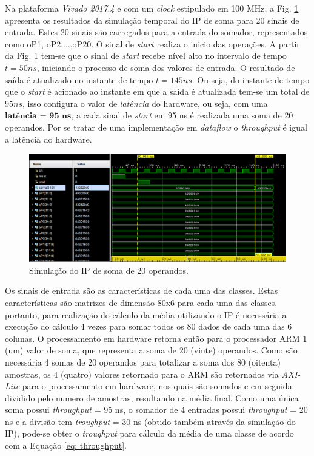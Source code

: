 Na plataforma \textit{Vivado 2017.4} e com um \textit{clock} estipulado em 100 MHz, a Fig. \ref{simulacao_sum} apresenta os resultados da simulação temporal do IP de soma para 20 sinais de entrada. Estes 20 sinais são carregados para a entrada do somador, representados como oP1, oP2,...,oP20. O sinal de \textit{start} realiza o inicio das operações. A partir da Fig. \ref{simulacao_sum} tem-se que o sinal de \textit{start} recebe nível alto no intervalo de tempo $t = 50 ns$, iniciando o processo de soma dos valores de entrada. O resultado de saída é atualizado no instante de tempo $t = 145 ns$. Ou seja, do instante de tempo que o \textit{start} é acionado ao instante em que a saída é atualizada tem-se um total de $95 ns$, isso configura o valor de \textit{latência} do hardware, ou seja, com uma $\textbf{latência = 95 ns}$, a cada sinal de \textit{start} em 95 ns é realizada uma soma de 20 operandos. Por se tratar de uma implementação em \textit{dataflow} o \textit{throughput} é igual a latência do hardware.

\begin{figure}[!h]
	\centering
	\includegraphics[keepaspectratio=true,scale=0.5]{figuras/Simulacao_somatorio.PNG}
	\caption{Simulação do IP de soma de 20 operandos.}
	\label{simulacao_sum}
\end{figure} 


Os sinais de entrada são as características de cada uma das classes. Estas características são matrizes de dimensão 80x6 para cada uma das classes, portanto, para realização do cálculo da média utilizando o IP é necessária a execução do cálculo 4 vezes para somar todos os 80 dados de cada uma das 6 colunas. O processamento em hardware retorna então para o processador ARM 1 (um) valor de soma, que representa a soma de 20 (vinte) operandos. Como são necessária 4 somas de 20 operandos para totalizar a soma dos 80 (oitenta) amostras, os 4 (quatro) valores retornado para o ARM são retornados via \textit{AXI-Lite} para o processamento em hardware, nos quais são somados e em seguida dividido pelo numero de amostras, resultando na média final. Como uma única soma possui \textit{throughput} = 95 ns, o somador de 4 entradas possui \textit{throughput} = 20 ns e a divisão tem \textit{troughput} = 30 ns (obtido também através da simulação do IP), pode-se obter o \textit{troughput} para cálculo da média de uma classe de acordo com a Equação \ref{eq: throughput}.


